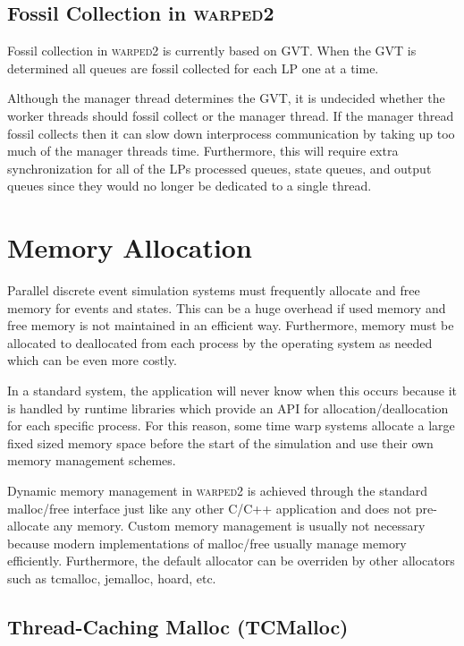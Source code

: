 \documentclass[11pt]{book}
\begin{document}
\subsection{Fossil Collection in \textsc{warped2}}

Fossil collection in \textsc{warped2} is currently based on GVT. When the GVT is determined
all queues are fossil collected for each LP one at a time.

Although the manager thread determines the GVT, it is undecided whether the worker threads
should fossil collect or the manager thread. If the manager thread fossil collects then
it can slow down interprocess communication by taking up too much of the manager threads
time. Furthermore, this will require extra synchronization for all of the LPs processed
queues, state queues, and output queues since they would no longer be dedicated to a single
thread.


\section{Memory Allocation}

Parallel discrete event simulation systems must frequently allocate and free memory for
events and states. This can be a huge overhead if used memory and free memory is not
maintained in an efficient way. Furthermore, memory must be allocated to deallocated from
each process by the operating system as needed which can be even more costly.

In a standard system, the application will never know when this occurs because it is handled
by runtime libraries which provide an API for allocation/deallocation for each specific
process. For this reason, some time warp systems allocate a large fixed sized memory space
before the start of the simulation and use their own memory management schemes.

Dynamic memory management in \textsc{warped2} is achieved through the standard malloc/free
interface just like any other C/C++ application and does not pre-allocate any memory.
Custom memory management is usually not necessary because modern implementations of malloc/free
usually manage memory efficiently. Furthermore, the default allocator can be overriden by
other allocators such as tcmalloc, jemalloc, hoard, etc.

\subsection{Thread-Caching Malloc (TCMalloc)}
\end{document}

